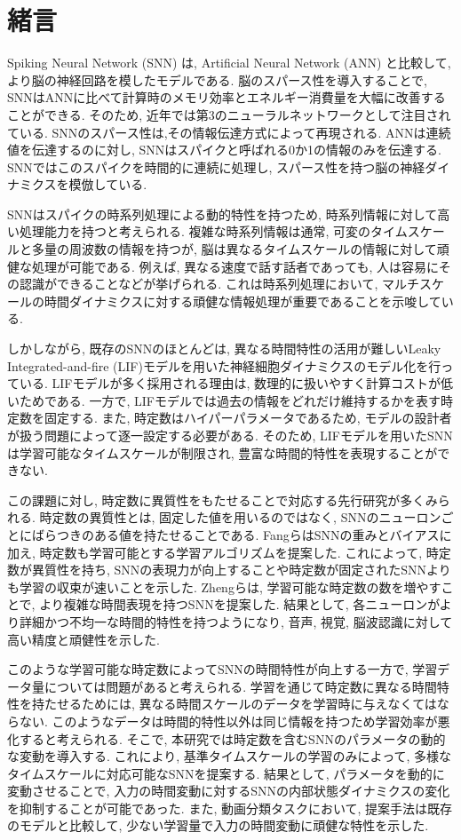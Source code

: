 \section{緒言}
Spiking Neural Network (SNN) は, Artificial Neural Network (ANN) と比較して, より脳の神経回路を模したモデルである\cite{TAVANAEI201947}.
脳のスパース性を導入することで, SNNはANNに比べて計算時のメモリ効率とエネルギー消費量を大幅に改善することができる.
そのため, 近年では第3のニューラルネットワークとして注目されている\cite{Henkes2024}.
SNNのスパース性は,その情報伝達方式によって再現される.
ANNは連続値を伝達するのに対し, SNNはスパイクと呼ばれる0か1の情報のみを伝達する.
SNNではこのスパイクを時間的に連続に処理し, スパース性を持つ脳の神経ダイナミクスを模倣している.

SNNはスパイクの時系列処理による動的特性を持つため, 時系列情報に対して高い処理能力を持つと考えられる\cite{zheng2024temporal}.
複雑な時系列情報は通常, 可変のタイムスケールと多量の周波数の情報を持つが, 脳は異なるタイムスケールの情報に対して頑健な処理が可能である\cite{10.1162/jocn_a_01615}.
例えば, 異なる速度で話す話者であっても, 人は容易にその認識ができることなどが挙げられる.
これは時系列処理において, マルチスケールの時間ダイナミクスに対する頑健な情報処理が重要であることを示唆している.

しかしながら, 既存のSNNのほとんどは, 異なる時間特性の活用が難しいLeaky Integrated-and-fire (LIF)モデルを用いた神経細胞ダイナミクスのモデル化を行っている\cite{dayan2003theoretical}.
LIFモデルが多く採用される理由は, 数理的に扱いやすく計算コストが低いためである.
一方で, LIFモデルでは過去の情報をどれだけ維持するかを表す時定数を固定する.
また, 時定数はハイパーパラメータであるため, モデルの設計者が扱う問題によって逐一設定する必要がある.
そのため, LIFモデルを用いたSNNは学習可能なタイムスケールが制限され, 豊富な時間的特性を表現することができない.

この課題に対し, 時定数に異質性をもたせることで対応する先行研究が多くみられる\cite{10.1145/3407197.3407225}\cite{ParametricSNN}.
時定数の異質性とは, 固定した値を用いるのではなく, SNNのニューロンごとにばらつきのある値を持たせることである.
Fangら\cite{ParametricSNN}はSNNの重みとバイアスに加え, 時定数も学習可能とする学習アルゴリズムを提案した.
これによって, 時定数が異質性を持ち, SNNの表現力が向上することや時定数が固定されたSNNよりも学習の収束が速いことを示した.
Zhengら\cite{zheng2024temporal}は, 学習可能な時定数の数を増やすことで, より複雑な時間表現を持つSNNを提案した.
結果として, 各ニューロンがより詳細かつ不均一な時間的特性を持つようになり, 音声, 視覚, 脳波認識に対して高い精度と頑健性を示した.

このような学習可能な時定数によってSNNの時間特性が向上する一方で, 学習データ量については問題があると考えられる.
学習を通じて時定数に異なる時間特性を持たせるためには, 異なる時間スケールのデータを学習時に与えなくてはならない.
このようなデータは時間的特性以外は同じ情報を持つため学習効率が悪化すると考えられる.
そこで, 本研究では時定数を含むSNNのパラメータの動的な変動を導入する.
これにより, 基準タイムスケールの学習のみによって, 多様なタイムスケールに対応可能なSNNを提案する.
結果として, パラメータを動的に変動させることで, 入力の時間変動に対するSNNの内部状態ダイナミクスの変化を抑制することが可能であった.
また, 動画分類タスクにおいて, 提案手法は既存のモデルと比較して, 少ない学習量で入力の時間変動に頑健な特性を示した.

